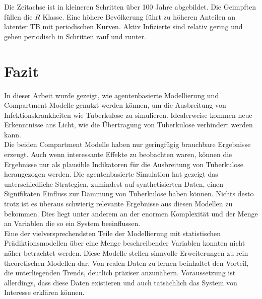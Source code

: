 \documentclass[paper=a4, fontsize=11pt, ngerman, abstract=on]{scrartcl}
\numberwithin{equation}{section} %
\numberwithin{figure}{section} %
\numberwithin{table}{section} %
\begin{document}
Die Zeitachse ist in kleineren Schritten über 100 Jahre abgebildet. Die Geimpften füllen die $R$ Klasse. Eine höhere Bevölkerung führt zu höheren Anteilen an latenter TB mit periodischen Kurven. Aktiv Infizierte sind relativ gering und gehen periodisch in Schritten rauf und runter.

\newpage

\section{Fazit}

In dieser Arbeit wurde gezeigt, wie agentenbasierte Modellierung und Compartment Modelle genutzt werden können, um die Ausbreitung von Infektionskrankheiten wie Tuberkulose zu simulieren. Idealerweise kommen neue Erkenntnisse ans Licht, wie die Übertragung von Tuberkulose verhindert werden kann. \\

Die beiden Compartment Modelle haben nur geringfügig brauchbare Ergebnisse erzeugt. Auch wenn interessante Effekte zu beobachten waren, können die Ergebnisse nur als plausible Indikatoren für die Ausbreitung von Tuberkulose herangezogen werden. Die agentenbasierte Simulation hat gezeigt das unterschiedliche Strategien, zumindest auf synthetisierten Daten, einen Signifikaten Einfluss zur Dämmung von Tuberkulose haben können. Nichts desto trotz ist es überaus schwierig relevante Ergebnisse aus diesen Modellen zu bekommen. Dies liegt unter anderem an der enormen Komplexität und der Menge an Variablen die so ein System beeinflussen. \\

Eine der vielversprechendsten Teile der Modellierung mit statistischen Prädiktionsmodellen über eine Menge beschreibender Variablen konnten nicht näher betrachtet werden. Diese Modelle stellen sinnvolle Erweiterungen zu rein theoretischen Modellen dar. Von realen Daten zu lernen beinhaltet den Vorteil, die unterliegenden Trends, deutlich präziser anzunähern. Voraussetzung ist allerdings, dass diese Daten existieren und auch tatsächlich das System von Interesse erklären können.

\newpage



\end{document}
